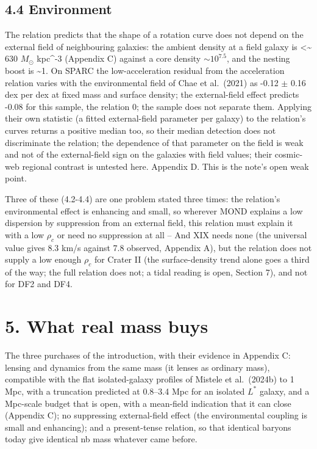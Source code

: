\documentclass[
  10pt,
]{article}
\begin{document}
\subsection{4.4 Environment}

The relation predicts that the shape of a rotation curve
does not depend on the external field of neighbouring galaxies: the ambient density at a field galaxy is \textless{}\textasciitilde{} 630 $M_\odot$ kpc\^{}-3 (Appendix C) against a core density
$\sim 10^{7.5}$, and the nesting boost is \textasciitilde{}1. On SPARC the low-acceleration residual from the
acceleration relation varies with the environmental field of Chae et
al.~(2021) as -0.12 $\pm$ 0.16 dex per dex at fixed mass and surface
density; the external-field effect predicts -0.08 for this sample, the
relation 0; the sample does not separate them. Applying their own statistic
(a fitted external-field parameter per galaxy) to the relation's curves
returns a positive median too, so their median detection does not
discriminate the relation; the dependence of that parameter on the field is
weak and not of the external-field sign on the galaxies with field
values; their cosmic-web regional contrast is untested here. Appendix D.
This is the note's open weak point.

Three of these (4.2-4.4) are one problem stated three times: the relation's
environmental effect is enhancing and small, so wherever MOND explains a
low dispersion by suppression from an external field, this relation must
explain it with a low $\rho_c$ or need no suppression at all -- And XIX needs none (the universal value gives 8.3 km/s against 7.8 observed, Appendix A), but the relation does not supply a low enough $\rho_c$ for
Crater II (the surface-density trend alone goes a third of the way; the full relation does not; a tidal reading is open, Section 7), and not for DF2 and DF4.

\section{5. What real mass buys}\label{what-real-mass-buys}

The three purchases of the introduction, with their evidence in Appendix
C: lensing and dynamics from the same mass (it lenses as ordinary mass),
compatible with the flat isolated-galaxy profiles of Mistele et al.~(2024b) to 1 Mpc, with a truncation predicted at 0.8--3.4 Mpc for an isolated $L^*$ galaxy, and a Mpc-scale budget that is open, with a mean-field indication that it can close (Appendix C);
no suppressing external-field effect (the environmental coupling is
small and enhancing); and a present-tense relation, so that identical baryons
today give identical nb mass whatever came before.
\end{document}
